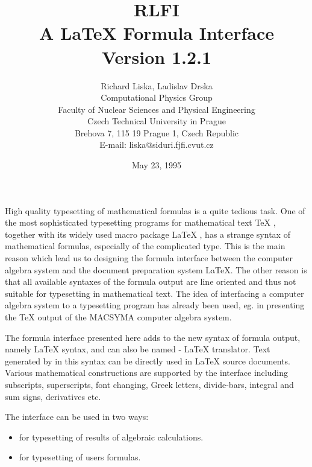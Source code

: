 \title{RLFI\\
       A \REDUCE{} \LaTeX{} Formula Interface\\
       Version 1.2.1}
\date{May 23, 1995}
\author{Richard Liska, Ladislav Drska\\
        Computational Physics Group\\
        Faculty of Nuclear Sciences and Physical Engineering\\
        Czech Technical University in Prague\\
        Brehova 7, 115 19 Prague 1, Czech Republic\\
        E-mail: liska@siduri.fjfi.cvut.cz}

\maketitle


High quality typesetting of mathematical formulas is a quite tedious
task.  One of the most sophisticated typesetting programs for
mathematical text \TeX{} \cite{Knuth:84}, together with its widely used
macro package \LaTeX{} \cite{Lamport:86}, has a strange syntax of
mathematical formulas, especially of the complicated type.  This is the
main reason which lead us to designing the formula interface between the
computer algebra system \REDUCE{} and the document preparation system
\LaTeX{}.  The other reason is that all available syntaxes of the
\REDUCE{} formula output are line oriented and thus not suitable for
typesetting in mathematical text.  The idea of interfacing a computer
algebra system to a typesetting program has already been used, eg.  in
\cite{Fateman:87} presenting the \TeX{} output of the MACSYMA computer
algebra system.

The formula interface presented here adds to \REDUCE{} the new syntax of
formula output, namely \LaTeX{} syntax, and can also be named \REDUCE{} -
\LaTeX{} translator.  Text generated by \REDUCE{} in this syntax can be
directly used in \LaTeX{} source documents.  Various mathematical
constructions are supported by the interface including subscripts,
superscripts, font changing, Greek letters, divide-bars, integral and
sum signs, derivatives etc.

The interface can be used in two ways:
\begin{itemize}
\item for typesetting of results of \REDUCE{} algebraic calculations.
\item for typesetting of users formulas.
\end{itemize}

